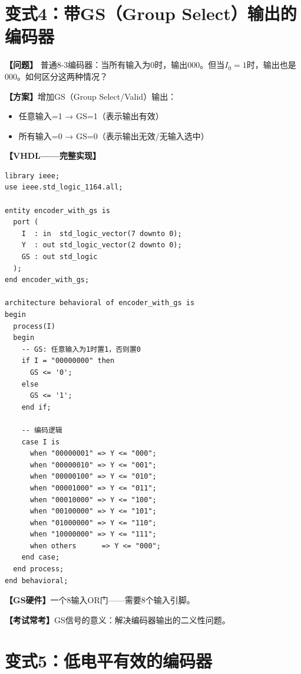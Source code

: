 \section{变式4：带GS（Group Select）输出的编码器}

\begin{detailbox}[完整教学]

\textbf{【问题】}
普通8-3编码器：当所有输入为0时，输出000。但当$I_0=1$时，输出也是000。如何区分这两种情况？

\textbf{【方案】}增加GS（Group Select/Valid）输出：
\begin{itemize}
  \item 任意输入=1 → GS=1（表示输出有效）
  \item 所有输入=0 → GS=0（表示输出无效/无输入选中）
\end{itemize}

\textbf{【VHDL——完整实现】}
\begin{lstlisting}[caption={带GS输出的8-3编码器VHDL实现}]
library ieee;
use ieee.std_logic_1164.all;

entity encoder_with_gs is
  port (
    I  : in  std_logic_vector(7 downto 0);
    Y  : out std_logic_vector(2 downto 0);
    GS : out std_logic
  );
end encoder_with_gs;

architecture behavioral of encoder_with_gs is
begin
  process(I)
  begin
    -- GS: 任意输入为1时置1，否则置0
    if I = "00000000" then
      GS <= '0';
    else
      GS <= '1';
    end if;

    -- 编码逻辑
    case I is
      when "00000001" => Y <= "000";
      when "00000010" => Y <= "001";
      when "00000100" => Y <= "010";
      when "00001000" => Y <= "011";
      when "00010000" => Y <= "100";
      when "00100000" => Y <= "101";
      when "01000000" => Y <= "110";
      when "10000000" => Y <= "111";
      when others      => Y <= "000";
    end case;
  end process;
end behavioral;
\end{lstlisting}

\textbf{【GS硬件】}一个8输入OR门——需要8个输入引脚。

\textbf{【考试常考】}GS信号的意义：解决编码器输出的二义性问题。

\end{detailbox}


\section{变式5：低电平有效的编码器}

